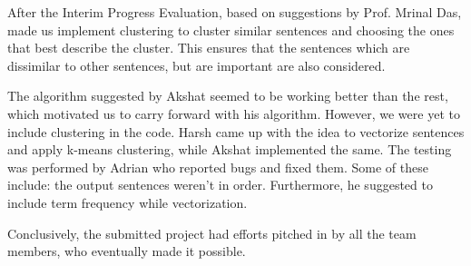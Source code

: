 After the Interim Progress Evaluation, based on suggestions by Prof.
Mrinal Das, made us implement clustering to cluster similar sentences
and choosing the ones that best describe the cluster. This ensures
that the sentences which are dissimilar to other sentences, but are
important are also considered.

The algorithm suggested by Akshat seemed to be working better than
the rest, which motivated us to carry forward with his algorithm.
However, we were yet to include clustering in the code. Harsh came
up with the idea to vectorize sentences and apply k-means clustering,
while Akshat implemented the same. The testing was performed by Adrian
who reported bugs and fixed them. Some of these include: the output
sentences weren\textquoteright t in order. Furthermore, he suggested
to include term frequency while vectorization.

Conclusively, the submitted project had efforts pitched in by all
the team members, who eventually made it possible.
